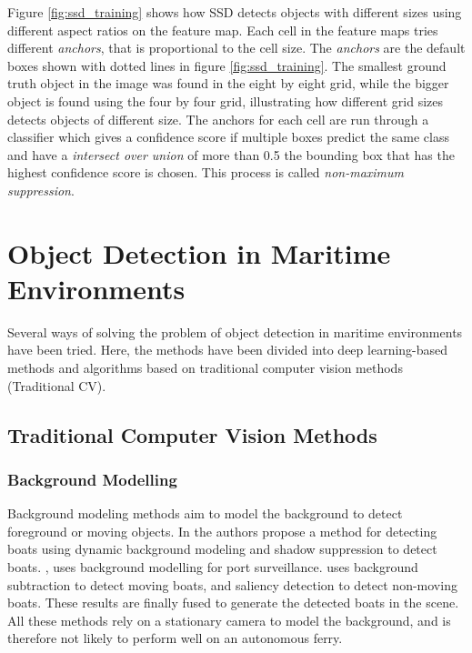 Figure \ref{fig:ssd_training} shows how SSD detects objects with different sizes using different aspect ratios on the feature map. Each cell in the feature maps tries different \textit{anchors}, that is proportional to the cell size. The \textit{anchors} are the default boxes shown with dotted lines in figure \ref{fig:ssd_training}. The smallest ground truth object in the image was found in the eight by eight grid, while the bigger object is found using the four by four grid, illustrating how different grid sizes detects objects of different size. The anchors for each cell are run through a classifier which gives a confidence score if multiple boxes predict the same class and have a \textit{intersect over union} of more than 0.5 the bounding box that has the highest confidence score is chosen. This process is called \textit{non-maximum suppression}.


\section{Object Detection in Maritime Environments}
\label{sec:obj_det}

Several ways of solving the problem of object detection in maritime environments have been tried. Here, the methods have been divided into deep learning-based methods and algorithms based on traditional computer vision methods (Traditional CV). 

\subsection{Traditional Computer Vision Methods}

\subsubsection{Background Modelling}
Background modeling methods aim to model the background to detect foreground or moving objects. In \citep{BackgroundWaveletSubstract} the authors propose a method for detecting boats using dynamic background modeling and shadow suppression to detect boats. \citep{SeeCoast}, \citep{Pires2010} uses background modelling for port surveillance. \citep{Tran2016} uses background subtraction to detect moving boats, and saliency detection to detect non-moving boats. These results are finally fused to generate the detected boats in the scene. All these methods rely on a stationary camera to model the background, and is therefore not likely to perform well on an autonomous ferry.

